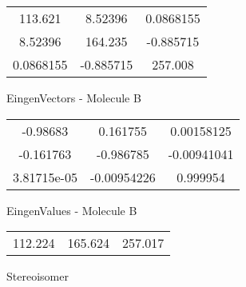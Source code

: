 \begin{multicols}{2}
\begin{center}
\begin{tabular}{|c c c|}
113.621	 & 	8.52396	 & 	0.0868155	 \\
8.52396	 & 	164.235	 & 	-0.885715	 \\
0.0868155	 & 	-0.885715	 & 	257.008
\end{tabular}

\vtab
 EingenVectors - Molecule B     \\
\vtab
\begin{tabular}{|c c c|}
-0.98683	 & 	0.161755	 & 	0.00158125	 \\
-0.161763	 & 	-0.986785	 & 	-0.00941041	 \\
3.81715e-05	 & 	-0.00954226	 & 	0.999954
\end{tabular}

\vtab
 EingenValues - Molecule B     \\
\vtab
\begin{tabular}{|c c c|}
112.224	 & 	165.624	 & 	257.017	 \\
\end{tabular}

\end{center}
\end{multicols}
\begin{center}
\vtab
\vtab
\textcolor{NavyBlue}{\Large Stereoisomer}
\end{center}

 \newpage


